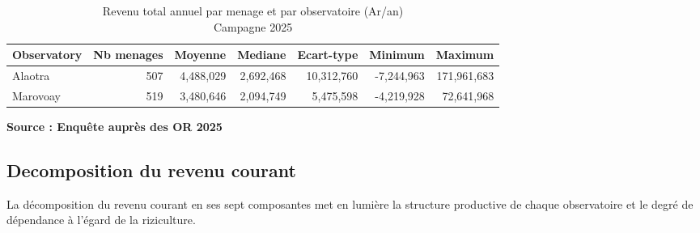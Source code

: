 \documentclass[
  french,
  letterpaper,
]{report}
\begin{document}
\begin{table}
\caption*{
{\fontsize{20}{25}\selectfont  Revenu total annuel par menage et par observatoire (Ar/an)\fontsize{12}{15}\selectfont } \\ 
{\fontsize{14}{17}\selectfont  Campagne 2025\fontsize{12}{15}\selectfont }
} 
\fontsize{12.0pt}{14.0pt}\selectfont
\begin{tabular*}{\linewidth}{@{\extracolsep{\fill}}lrrrrrr}
\toprule
{\bfseries {Observatory}} & {\bfseries {Nb menages}} & {\bfseries {Moyenne}} & {\bfseries {Mediane}} & {\bfseries {Ecart-type}} & {\bfseries {Minimum}} & {\bfseries {Maximum}} \\ 
\midrule\addlinespace[2.5pt]
Alaotra & 507 & 4,488,029 & 2,692,468 & 10,312,760 & -7,244,963 & 171,961,683 \\ 
Marovoay & 519 & 3,480,646 & 2,094,749 & 5,475,598 & -4,219,928 & 72,641,968 \\ 
\bottomrule
\end{tabular*}
\begin{minipage}{\linewidth}
\textbf{Source : Enquête auprès des OR 2025}\\
\end{minipage}
\end{table}

\subsection{Decomposition du revenu
courant}\label{decomposition-du-revenu-courant}

La décomposition du revenu courant en ses sept composantes met en
lumière la structure productive de chaque observatoire et le degré de
dépendance à l'égard de la riziculture.
\end{document}
